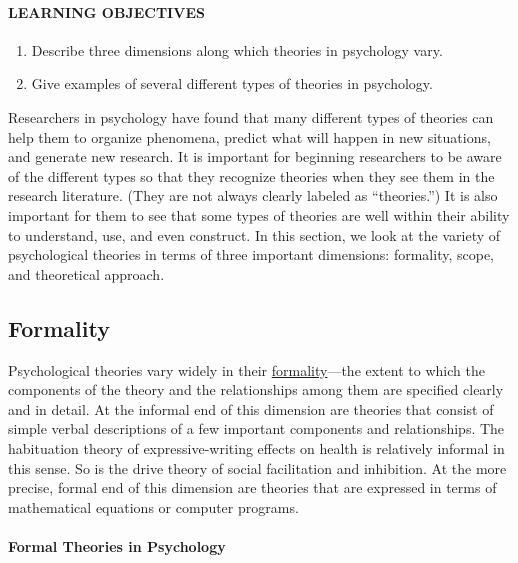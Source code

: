 \documentclass[
]{krantz}
\providecommand{\tightlist}{%
  \setlength{\itemsep}{0pt}\setlength{\parskip}{0pt}}
\begin{document}
\hypertarget{learning-objectives-7}{%
\paragraph*{LEARNING OBJECTIVES}\label{learning-objectives-7}}

\begin{enumerate}
\def\labelenumi{\arabic{enumi}.}
\tightlist
\item
  Describe three dimensions along which theories in psychology vary.
\item
  Give examples of several different types of theories in psychology.
\end{enumerate}

Researchers in psychology have found that many different types of theories can help them to organize phenomena, predict what will happen in new situations, and generate new research. It is important for beginning researchers to be aware of the different types so that they recognize theories when they see them in the research literature. (They are not always clearly labeled as ``theories.'') It is also important for them to see that some types of theories are well within their ability to understand, use, and even construct. In this section, we look at the variety of psychological theories in terms of three important dimensions: formality, scope, and theoretical approach.

\hypertarget{formality}{%
\subsection*{Formality}\label{formality}}


Psychological theories vary widely in their \protect\hyperlink{formality-1}{formality}---the extent to which the components of the theory and the relationships among them are specified clearly and in detail. At the informal end of this dimension are theories that consist of simple verbal descriptions of a few important components and relationships. The habituation theory of expressive-writing effects on health is relatively informal in this sense. So is the drive theory of social facilitation and inhibition. At the more precise, formal end of this dimension are theories that are expressed in terms of mathematical equations or computer programs.

\hypertarget{formal-theories-in-psychology}{%
\paragraph*{Formal Theories in Psychology}\label{formal-theories-in-psychology}}
\end{document}
